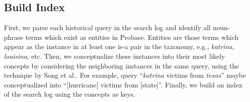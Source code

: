 \subsection{Build Index}\label{sec:index}
First, we parse each historical query in the search log and identify
all noun-phrase terms which exist as entities in Probase.
Entities are those terms which appear
as the instance in at least one is-a pair in the taxonomy,
e.g., {\em katrina}, {\em louisina}, etc.
Then, we conceptualize these instances into their most likely concepts by
considering the neighboring instances in the same query, using the technique
by Song et al.\cite{Song11:Conceptualize,wang2012concept}.
For example, query ``{\em katrina} victims from {\em texas}''
maybe conceptualized into
``[hurricane] victims from [state]''. Finally, we build an index of
the search log using the concepts as keys.


